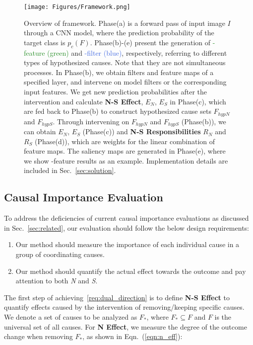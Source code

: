 \begin{figure*}[htbp]
  \centering
   \texttt{[image: Figures/Framework.png]}
\caption{
Overview of \name{} framework.
Phase(a) is a forward pass of input image $I$ through a CNN model, where the prediction probability of the target class is $p_{c}(F)$.
Phase(b)-(e) present the generation of \textcolor{ForestGreen}{\name{}-feature (green)} and \textcolor{RoyalBlue}{\name{}-filter (blue)}, respectively, referring to different types of hypothesized causes.
Note that they are not simultaneous processes.
In Phase(b), we obtain filters and feature maps of a specified layer, and intervene on model filters or the corresponding input features.
We get new prediction probabilities after the intervention and calculate \textbf{N-S Effect}, $E_N$, $E_S$ in Phase(c), which are fed back to Phase(b) to construct hypothesized cause sets $F_{hypN}$ and $F_{hypS}$.
Through intervening on $F_{hypN}$ and $F_{hypS}$ (Phase(b)), we can obtain $E_N$, $E_S$ (Phase(c)) and \textbf{N-S Responsibilities} $R_N$ and $R_S$ (Phase(d)), which are weights for the linear combination of feature maps.
The saliency maps are generated in Phase(e), where we show \name{}-feature results as an example.
Implementation details are included in Sec.~\ref{sec:solution}.
}
   \label{fig:framework}
\end{figure*}

\subsection{Causal Importance Evaluation}
\label{subsec:ns_res}

To address the deficiencies of current causal importance evaluations as discussed in Sec.~\ref{sec:related}, our evaluation should follow the below design requirements:

\begin{enumerate}[start=1,label={\bfseries R\arabic*},leftmargin=*,topsep=2px,partopsep=2px]
\setlength{\itemsep}{0pt}%
\setlength{\parskip}{0pt}
    \item \label{req:set_size}
Our method should measure the importance of each individual cause in a group of coordinating causes. 
    \item \label{req:dual_direction}
Our method should quantify the actual effect towards the outcome and pay attention to both \textit{N} and \textit{S}.
\end{enumerate}

The first step of achieving~\ref{req:dual_direction} is to define \textbf{N-S Effect} to quantify effects caused by the intervention of removing/keeping specific causes.
We denote a set of causes to be analyzed as $F_*$, where $F_* \subseteq F$ and $F$ is the universal set of all causes.
For \textbf{N Effect}, we measure the degree of the outcome change when removing $F_*$, as shown in Eqn.~(\ref{eqn:n_eff}):

